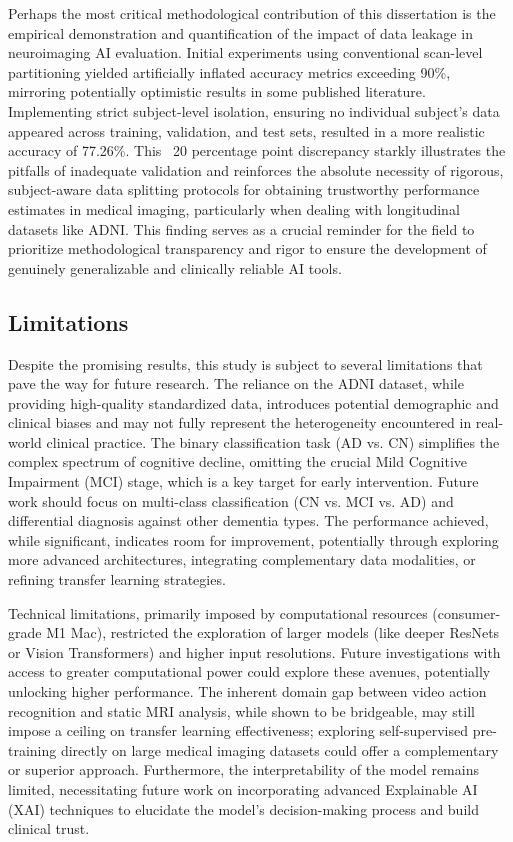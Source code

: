 \documentclass[11pt, a4paper]{article}
\begin{document}
Perhaps the most critical methodological contribution of this dissertation is the empirical demonstration and quantification of the impact of data leakage in neuroimaging AI evaluation. Initial experiments using conventional scan-level partitioning yielded artificially inflated accuracy metrics exceeding 90\%, mirroring potentially optimistic results in some published literature. Implementing strict subject-level isolation, ensuring no individual subject's data appeared across training, validation, and test sets, resulted in a more realistic accuracy of 77.26\%. This ~20 percentage point discrepancy starkly illustrates the pitfalls of inadequate validation and reinforces the absolute necessity of rigorous, subject-aware data splitting protocols for obtaining trustworthy performance estimates in medical imaging, particularly when dealing with longitudinal datasets like ADNI. This finding serves as a crucial reminder for the field to prioritize methodological transparency and rigor to ensure the development of genuinely generalizable and clinically reliable AI tools.

\subsection{Limitations}

Despite the promising results, this study is subject to several limitations that pave the way for future research. The reliance on the ADNI dataset, while providing high-quality standardized data, introduces potential demographic and clinical biases and may not fully represent the heterogeneity encountered in real-world clinical practice. The binary classification task (AD vs. CN) simplifies the complex spectrum of cognitive decline, omitting the crucial Mild Cognitive Impairment (MCI) stage, which is a key target for early intervention. Future work should focus on multi-class classification (CN vs. MCI vs. AD) and differential diagnosis against other dementia types. The performance achieved, while significant, indicates room for improvement, potentially through exploring more advanced architectures, integrating complementary data modalities, or refining transfer learning strategies.

Technical limitations, primarily imposed by computational resources (consumer-grade M1 Mac), restricted the exploration of larger models (like deeper ResNets or Vision Transformers) and higher input resolutions. Future investigations with access to greater computational power could explore these avenues, potentially unlocking higher performance. The inherent domain gap between video action recognition and static MRI analysis, while shown to be bridgeable, may still impose a ceiling on transfer learning effectiveness; exploring self-supervised pre-training directly on large medical imaging datasets could offer a complementary or superior approach. Furthermore, the interpretability of the model remains limited, necessitating future work on incorporating advanced Explainable AI (XAI) techniques to elucidate the model's decision-making process and build clinical trust.
\end{document}
